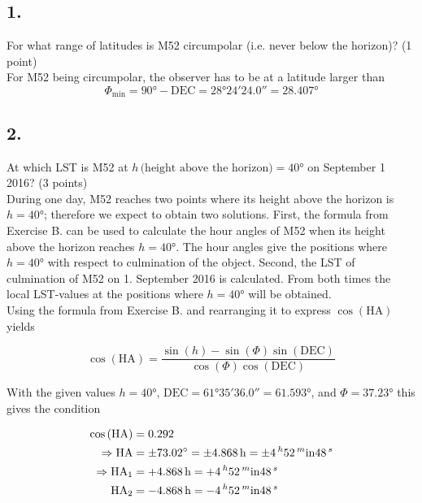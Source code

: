 \documentclass[11pt,a4paper,twoside]{article}
\begin{document}
\subsection*{1.} For what range of latitudes is M52 circumpolar (i.e. never below the horizon)? (1 point) \\

For M52 being circumpolar, the observer has to be at a latitude larger than 
\begin{equation}
 \Phi_{\text{min}} = \ang{90} - \text{DEC} = \ang{28;24;24.0} = \ang{28.407}
\end{equation}

\subsection*{2.} At which LST is M52 at $h \, \text{(height above the horizon)} = \ang{40}$ on September 1 2016? (3 points) \\

During one day, M52 reaches two points where its height above the horizon is $h=\ang{40}$; therefore we expect to obtain two solutions. First, the formula from Exercise B. can be used to calculate the hour angles of M52 when its height above the horizon reaches $h=\ang{40}$. The hour angles give the positions where $h=\ang{40}$ with respect to culmination of the object. Second, the LST of culmination of M52 on 1. September 2016 is calculated. From both times the local LST-values at the positions where $h=\ang{40}$ will be obtained. \\

Using the formula from Exercise B. and rearranging it to express $\cos{ \left( \text{HA} \right)}$ yields

\begin{equation}
 \cos{ \left( \text{HA} \right)} = \frac{\sin{\left( h \right)} - \sin{\left( \Phi \right)} \sin{\left( \text{DEC} \right)}}{\cos{ \left( \Phi \right)} \cos{ \left( \text{DEC} \right)}}
\end{equation}

With the given values $h = \ang{40}$, $\text{DEC} = \ang{61;35;36.0} = \ang{61.593}$, and $\Phi = \ang{37.23}$ this gives the condition

\begin{align}
 \cos{\left( \text{HA} \right)} &= 0.292 \\
 \Rightarrow \text{HA} &= \pm \ang{73.02} = \pm \SI{4.868}{\hour} = \pm \SI{4}{^\hour} \SI{52}{^\minute} \SI{48}{^\second} \\
 \Rightarrow \text{HA}_1 &= +\SI{4.868}{\hour} = +\SI{4}{^\hour} \SI{52}{^\minute} \SI{48}{^\second} \\
 \text{HA}_2 &= -\SI{4.868}{\hour} = -\SI{4}{^\hour} \SI{52}{^\minute} \SI{48}{^\second} \\
\end{align}
\end{document}
